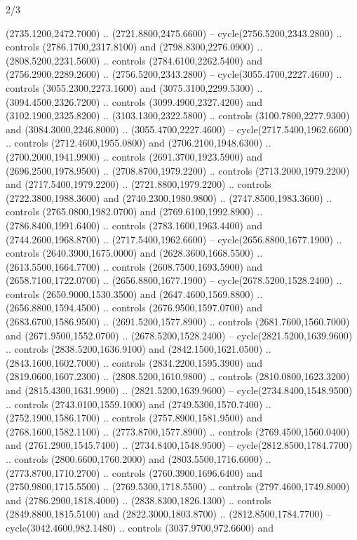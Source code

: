 \begin{flagdescription}{2/3}
\begin{scope}[shift={(0.5\flaglength,0.5)},scale=\flagwidth/130]
\begin{scope}[y=0.01mm, x=0.01mm,shift={(-3365,-2250)}]
  (2735.1200,2472.7000) .. (2721.8800,2475.6600) -- cycle(2756.5200,2343.2800)
  .. controls (2786.1700,2317.8100) and (2798.8300,2276.0900) ..
  (2808.5200,2231.5600) .. controls (2784.6100,2262.5400) and
  (2756.2900,2289.2600) .. (2756.5200,2343.2800) -- cycle(3055.4700,2227.4600)
  .. controls (3055.2300,2273.1600) and (3075.3100,2299.5300) ..
  (3094.4500,2326.7200) .. controls (3099.4900,2327.4200) and
  (3102.1900,2325.8200) .. (3103.1300,2322.5800) .. controls
  (3100.7800,2277.9300) and (3084.3000,2246.8000) .. (3055.4700,2227.4600) --
  cycle(2717.5400,1962.6600) .. controls (2712.4600,1955.0800) and
  (2706.2100,1948.6300) .. (2700.2000,1941.9900) .. controls
  (2691.3700,1923.5900) and (2696.2500,1978.9500) .. (2708.8700,1979.2200) ..
  controls (2713.2000,1979.2200) and (2717.5400,1979.2200) ..
  (2721.8800,1979.2200) .. controls (2722.3800,1988.3600) and
  (2740.2300,1980.9800) .. (2747.8500,1983.3600) .. controls
  (2765.0800,1982.0700) and (2769.6100,1992.8900) .. (2786.8400,1991.6400) ..
  controls (2783.1600,1963.4400) and (2744.2600,1968.8700) ..
  (2717.5400,1962.6600) -- cycle(2656.8800,1677.1900) .. controls
  (2640.3900,1675.0000) and (2628.3600,1668.5500) .. (2613.5500,1664.7700) ..
  controls (2608.7500,1693.5900) and (2658.7100,1722.0700) ..
  (2656.8800,1677.1900) -- cycle(2678.5200,1528.2400) .. controls
  (2650.9000,1530.3500) and (2647.4600,1569.8800) .. (2656.8800,1594.4500) ..
  controls (2676.9500,1597.0700) and (2683.6700,1586.9500) ..
  (2691.5200,1577.8900) .. controls (2681.7600,1560.7000) and
  (2671.9500,1552.0700) .. (2678.5200,1528.2400) -- cycle(2821.5200,1639.9600)
  .. controls (2838.5200,1636.9100) and (2842.1500,1621.0500) ..
  (2843.1600,1602.7000) .. controls (2834.2200,1595.3900) and
  (2819.0600,1607.2300) .. (2808.5200,1610.9800) .. controls
  (2810.0800,1623.3200) and (2815.4300,1631.9900) .. (2821.5200,1639.9600) --
  cycle(2734.8400,1548.9500) .. controls (2743.0100,1559.1000) and
  (2749.5300,1570.7400) .. (2752.1900,1586.1700) .. controls
  (2757.8900,1581.9500) and (2768.1600,1582.1100) .. (2773.8700,1577.8900) ..
  controls (2769.4500,1560.0400) and (2761.2900,1545.7400) ..
  (2734.8400,1548.9500) -- cycle(2812.8500,1784.7700) .. controls
  (2800.6600,1760.2000) and (2803.5500,1716.6000) .. (2773.8700,1710.2700) ..
  controls (2760.3900,1696.6400) and (2750.9800,1715.5500) ..
  (2769.5300,1718.5500) .. controls (2797.4600,1749.8000) and
  (2786.2900,1818.4000) .. (2838.8300,1826.1300) .. controls
  (2849.8800,1815.5100) and (2822.3000,1803.8700) .. (2812.8500,1784.7700) --
  cycle(3042.4600,982.1480) .. controls (3037.9700,972.6600) and

\end{scope}
\end{scope}
\end{flagdescription}
